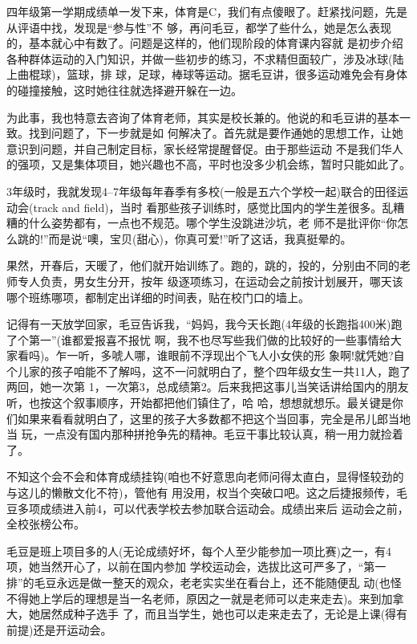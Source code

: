\documentclass[11pt,a4paper,onecolumn]{article}
\begin{document}
四年级第一学期成绩单一发下来，体育是C，我们有点傻眼了。赶紧找问题，先是从评语中找，发现是``参与性''不
够，再问毛豆，都学了些什么，她是怎么表现的，基本就心中有数了。问题是这样的，他们现阶段的体育课内容就
是初步介绍各种群体运动的入门知识，并做一些初步的练习，不求精但面较广，涉及冰球(陆上曲棍球)，篮球，排
球，足球，棒球等运动。据毛豆讲，很多运动难免会有身体的碰撞接触，这时她往往就选择避开躲在一边。


为此事，我也特意去咨询了体育老师，其实是校长兼的。他说的和毛豆讲的基本一致。找到问题了，下一步就是如
何解决了。首先就是要作通她的思想工作，让她意识到问题，并自己制定目标，家长经常提醒督促。由于那些运动
不是我们华人的强项，又是集体项目，她兴趣也不高，平时也没多少机会练，暂时只能如此了。


3年级时，我就发现4--7年级每年春季有多校(一般是五六个学校一起)联合的田径运动会(track and field)，当时
看那些孩子训练时，感觉比国内的学生差很多。乱糟糟的什么姿势都有，一点也不规范。哪个学生没跳进沙坑，老
师不是批评你``你怎么跳的!''而是说``噢，宝贝(甜心)，你真可爱!''听了这话，我真挺晕的。


果然，开春后，天暖了，他们就开始训练了。跑的，跳的，投的，分别由不同的老师专人负责，男女生分开，按年
级逐项练习，在运动会之前按计划展开，哪天该哪个班练哪项，都制定出详细的时间表，贴在校门口的墙上。


记得有一天放学回家，毛豆告诉我，``妈妈，我今天长跑(4年级的长跑指400米)跑了个第一''(谁都爱报喜不报忧
啊，我不也尽写些我们做的比较好的一些事情给大家看吗)。乍一听，多唬人哪，谁眼前不浮现出个飞人小女侠的形
象啊!就凭她?自个儿家的孩子咱能不了解吗，这不一问就明白了，整个四年级女生一共11人，跑了两回，她一次第
1，一次第3，总成绩第2。后来我把这事儿当笑话讲给国内的朋友听，也按这个叙事顺序，开始都把他们镇住了，哈
哈，想想就想乐。最关键是你们如果来看看就明白了，这里的孩子大多数都不把这个当回事，完全是吊儿郎当地当
玩，一点没有国内那种拼抢争先的精神。毛豆干事比较认真，稍一用力就捡着了。


不知这个会不会和体育成绩挂钩(咱也不好意思向老师问得太直白，显得怪较劲的与这儿的懒散文化不符)，管他有
用没用，权当个突破口吧。这之后捷报频传，毛豆多项成绩进入前4，可以代表学校去参加联合运动会。成绩出来后
运动会之前，全校张榜公布。


毛豆是班上项目多的人(无论成绩好坏，每个人至少能参加一项比赛)之一，有4项，她当然开心了，以前在国内参加
学校运动会，选拔比这可严多了，``第一排''的毛豆永远是做一整天的观众，老老实实坐在看台上，还不能随便乱
动(也怪不得她上学后的理想是当一名老师，原因之一就是老师可以走来走去)。来到加拿大，她居然成种子选手
了，而且当学生，她也可以走来走去了，无论是上课(得有前提)还是开运动会。
\end{document}
